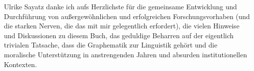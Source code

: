 Ulrike Sayatz danke ich aufs Herzlichste für die gemeinsame Entwicklung und Durchführung von außergewöhnlichen und erfolgreichen Forschungsvorhaben (und die starken Nerven, die das mit mir gelegentlich erfordert), die vielen Hinweise und Diskussionen zu diesem Buch, das geduldige Beharren auf der eigentlich trivialen Tatsache, dass die Graphematik zur Linguistik gehört und die moralische Unterstützung in anstrengenden Jahren und absurden institutionellen Kontexten.
